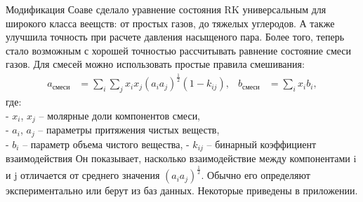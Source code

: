 \documentclass[a4paper]{article}
\numberwithin{equation}{subsection} %
\renewcommand{\thefootnote}{\fnsymbol{footnote}}
\begin{document}
\renewcommand{\thefootnote}{\arabic{footnote}} 
Модификация Соаве сделало уравнение состояния RK универсальным для широкого класса веещств: от простых газов, до тяжелых углеродов. А также улучшила точность при расчете давления насыщеного пара. Более того, теперь стало возможным с хорошей точностью рассчитывать равнение состояние смеси газов. Для смесей можно использовать простые правила смешивания: 
\begin{align}
     \displaystyle a_{\text{смеси}} &= \sum_i \sum_j x_ix_j(a_ia_j)^{\frac{1}{2}}(1-k_{ij}), & b_{\text{смеси}} &= \sum_i x_ib_i,
\end{align}
где:\\
- $x_i$, $x_j$ -- молярные доли компонентов смеси,\\
- $a_i$, $a_j$ -- параметры притяжения чистых веществ,\\
- $b_i$ -- параметр объема чистого вещества,
- $k_{ij}$ -- бинарный коэффициент взаимодействия Он показывает, насколько взаимодействие между компонентами i и j отличается от среднего значения $(a_ia_j)^{\frac{1}{2}}$. Обычно его определяют экспериментально или берут из баз данных. Некоторые приведены в приложении.
\end{document}
